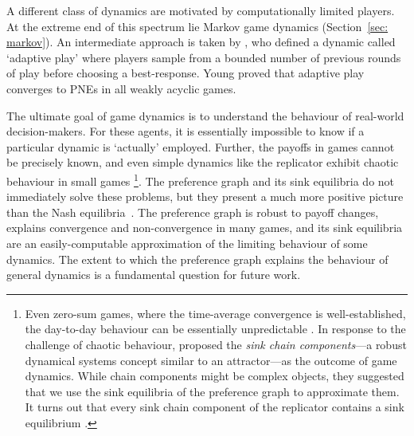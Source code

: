 \documentclass[preprint,authoryear]{elsarticle}
\begin{document}
A different class of dynamics are motivated by computationally limited players. At the extreme end of this spectrum lie Markov game dynamics (Section~\ref{sec: markov}). An intermediate approach is taken by \cite{young_evolution_1993}, who defined a dynamic called `adaptive play' where players sample from a bounded number of previous rounds of play before choosing a best-response. Young proved that adaptive play converges to PNEs in all weakly acyclic games.

The ultimate goal of game dynamics is to understand the behaviour of real-world decision-makers. For these agents, it is essentially impossible to know if a particular dynamic is `actually' employed. Further, the payoffs in games cannot be precisely known, and even simple dynamics like the replicator exhibit chaotic behaviour in small games \citep{sato_chaos_2002}\footnote{Even zero-sum games, where the time-average convergence is well-established, the day-to-day behaviour can be essentially unpredictable \citep{cheung2019vortices,papadimitriou_nash_2018}. In response to the challenge of chaotic behaviour, \citeauthor{papadimitriou_game_2019} proposed the \emph{sink chain components}---a robust dynamical systems concept similar to an attractor---as the outcome of game dynamics. While chain components might be complex objects, they suggested that we use the sink equilibria of the preference graph to approximate them. It turns out that every sink chain component of the replicator contains a sink equilibrium \citep{biggar_replicator_2023}.}.
The preference graph and its sink equilibria do not immediately solve these problems, but they present a much more positive picture than the Nash equilibria~\citep{milgrom_adaptive_1991,papadimitriou_game_2019}. The preference graph is robust to payoff changes, explains convergence and non-convergence in many games, and its sink equilibria are an easily-computable approximation of the limiting behaviour of some dynamics. The extent to which the preference graph explains the behaviour of general dynamics is a fundamental question for future work.
\end{document}
